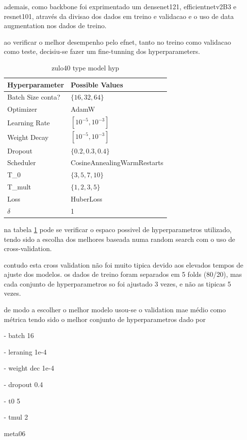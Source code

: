 \documentclass[conference]{IEEEtran}
\begin{document}
ademais, como backbone foi exprimentado um densenet121, efficientnetv2B3 e resnet101, através da divisao dos dados em treino e validacao e o uso de data augmentation nos dados de treino.

ao verificar o melhor desempenho pelo efnet, tanto no treino como validacao como teste, decisiu-se fazer um fine-tunning dos hyperparameters.

\begin{table}[H]
\centering
\caption{zulo40 type model hyp}
\label{parametroszulp}
\begin{tabular}{ll}
\toprule
\textbf{Hyperparameter} & \textbf{Possible Values} \\
\midrule
Batch Size conta? & $\{16, 32, 64\}$ \\
Optimizer & AdamW \\
Learning Rate & $[10^{-5}, 10^{-3}]$ \\
Weight Decay & $[10^{-5}, 10^{-3}]$ \\
Dropout & $\{0.2, 0.3, 0.4\}$ \\
Scheduler & CosineAnnealingWarmRestarts \\
T\_0 & $\{3, 5, 7, 10\}$ \\
T\_mult & $\{1, 2, 3, 5\}$ \\
Loss & HuberLoss \\
$\delta$ & 1 \\
\bottomrule
\end{tabular}
\end{table}


na tabela \ref{parametroszulp} pode se verificar o espaco possivel de hyperparametros utilizado, tendo sido a escolha dos melhores baseada numa random search com o uso de cross-validation.

contudo esta cross validation não foi muito tipica devido aos elevados tempos de ajuste dos modelos. os dados de treino foram separados em 5 folds (80/20), mas cada conjunto de hyperparametros so foi ajustado 3 vezes, e não as tipicas 5 vezes.

de modo a escolher o melhor modelo usou-se o validation mae médio como métrica tendo sido o melhor conjunto de hyperparametros dado por 

- batch 16

- leraning 1e-4

- weight dec 1e-4

- dropout 0.4

- t0 5

- tmul 2

meta06
\end{document}
